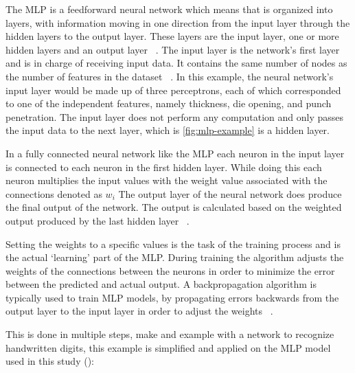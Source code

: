 {The MLP is a feedforward neural network which means that is organized into layers, with information
moving in one direction from the input layer through the hidden layers to the output
layer.
These layers are the input layer, one or more hidden layers and an output
layer
~\cite[pp. 279--280]{bishop1995neural}.
The input layer is the network's first layer and is in charge of receiving input data.
It contains the same number of nodes as the number of features in the dataset
~\cite[p. 105]{muller_introductionmachinelearning_2016}.
In this example, the neural network's input layer would be made up of three perceptrons, each of which corresponded
to one of the independent features, namely thickness, die opening, and punch penetration.
The input layer does not perform any computation and only passes the input data to the next layer, which is
\cref{fig:mlp-example} is a hidden layer.

In a fully connected neural network like the MLP each neuron in the input layer is connected to each neuron in the
first hidden layer.
While doing this each neuron multiplies the input values with the weight value associated with the connections
denoted as $w_i$
The output layer of the neural network does produce the final output of the network.
The output is calculated based on the weighted output produced by the last hidden layer
~\cite[p. 106]{muller_introductionmachinelearning_2016}.

Setting the weights to a specific values is the task of the training process and is the actual `learning' part of the
MLP.
During training the algorithm adjusts the weights of the connections between the neurons in order to minimize
the error between the predicted and actual output.
A backpropagation algorithm is typically used to train \ac{MLP} models, by
propagating errors backwards from the output layer to the input layer in order to adjust
the weights
~\cite[p. 454]{taud2018multilayer}.

This is done in multiple steps, \cite{nielsen_neuralnetworksdeep_2015} make and example with a network to recognize
handwritten digits, this example is simplified and applied on the MLP model used in this study
(\cite[p. 12--24]{nielsen_neuralnetworksdeep_2015}):

}
